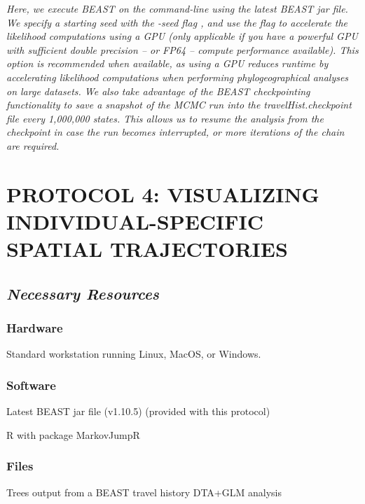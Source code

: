 \documentclass{article}
\newcommand{\ann}[1]{
\begin{adjustwidth}{0.5cm}{}
\it{#1}\\
\end{adjustwidth}}
\newcommand{\code}[1]{
{\upshape\ttfamily{#1}}}
\begin{document}
\ann{Here, we execute BEAST on the command-line using the latest BEAST jar file. We specify a starting seed with the -seed flag , %
and use the \code{-beagle\_cuda} flag to accelerate the likelihood computations using a GPU (only applicable if you have a powerful GPU with sufficient double precision -- or FP64 -- compute performance available).
This option is recommended when available, as using a GPU reduces runtime by accelerating likelihood computations when performing phylogeographical analyses on large datasets.
We also take advantage of the BEAST checkpointing functionality \cite{onlineBEAST} %
to save a snapshot of the MCMC run into the travelHist.checkpoint file every 1,000,000 states.
This allows us to resume the analysis from the checkpoint in case the run becomes interrupted, or more iterations of the chain are required.}

\section*{PROTOCOL 4: VISUALIZING INDIVIDUAL-SPECIFIC SPATIAL TRAJECTORIES} %
\subsection*{\textbf{\textit{Necessary Resources}}}
\subsubsection*{Hardware}
Standard workstation running Linux, MacOS, or Windows. 

\subsubsection*{Software}

\hspace{0.5cm}Latest BEAST jar file (v1.10.5) (provided with this protocol)

\hspace{0.5cm}R with package MarkovJumpR

\subsubsection*{Files}
Trees output from a BEAST travel history DTA+GLM analysis \\
\end{document}
